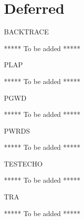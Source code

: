 \newpage
\section{Deferred}

\begin{Switch}[backtrace]{BACKTRACE}

***** To be added *****

\end{Switch}




\begin{Switch}[plap]{PLAP}

***** To be added *****

\end{Switch}


\begin{Switch}[pgwd]{PGWD}

***** To be added *****

\end{Switch}


\begin{Switch}[pwrds]{PWRDS}

***** To be added *****

\end{Switch}


\begin{Switch}[testecho]{TESTECHO}

***** To be added *****

\end{Switch}


\begin{Switch}[tra]{TRA}

***** To be added *****

\end{Switch}


